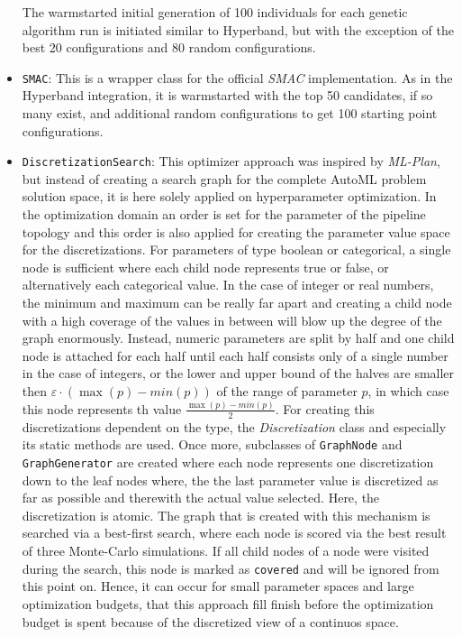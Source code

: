 \begin{itemize}
\begin{enumerate}
        \end{enumerate}
    The warmstarted initial generation of 100 individuals for each genetic algorithm run is initiated similar to Hyperband, but with the exception of the best 20 configurations and 80 random configurations.
    \item \texttt{SMAC}: This is a wrapper class for the official \textit{SMAC} implementation.
    As in the Hyperband integration, it is warmstarted with the top 50 candidates, if so many exist, and additional random configurations to get 100 starting point configurations.
    \item \texttt{DiscretizationSearch}: This optimizer approach was inspired by \textit{ML-Plan}, but instead of creating a search graph for the complete AutoML problem solution space, it is here solely applied on hyperparameter optimization.
    In the optimization domain an order is set for the parameter of the pipeline topology and this order is also applied for creating the parameter value space for the discretizations.
    For parameters of type boolean or categorical, a single node is sufficient where each child node represents true or false, or alternatively each categorical value.
    In the case of integer or real numbers, the minimum and maximum can be really far apart and creating a child node with a high coverage of the values in between will blow up the degree of the graph enormously.
    Instead, numeric parameters are split by half and one child node is attached for each half until each half consists only of a single number in the case of integers, or the lower and upper bound of the halves are smaller then $\varepsilon \cdot (\max(p) - min(p))$ of the range of parameter $p$, in which case this node represents th value $\frac{\max(p) - min(p)}{2}$.\newline
    For creating this discretizations dependent on the type, the \textit{Discretization} class and especially its static methods are used.
    Once more, subclasses of \texttt{GraphNode} and \texttt{GraphGenerator} are created where each node represents one discretization down to the leaf nodes where, the the last parameter value is discretized as far as possible and therewith the actual value selected. 
    Here, the discretization is atomic.\newline
    The graph that is created with this mechanism is searched via a best-first search, where each node is scored via the best result of three Monte-Carlo simulations.
    If all child nodes of a node were visited during the search, this node is marked as \texttt{covered} and will be ignored from this point on.
    Hence, it can occur for small parameter spaces and large optimization budgets, that this approach fill finish before the optimization budget is spent because of the discretized view of a continuos space.
\end{itemize}

